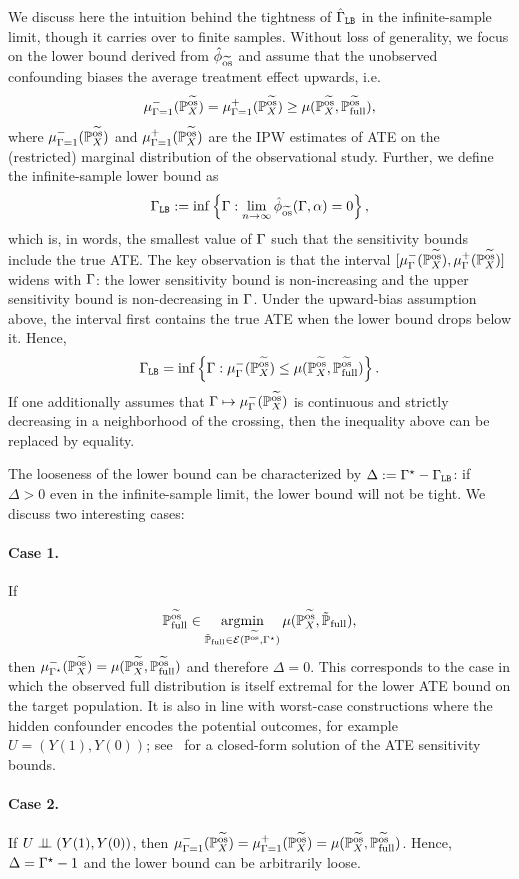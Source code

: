 We discuss here the intuition behind the tightness of $\hat{\Gamma}_{\texttt{LB}}$ in the infinite-sample limit, though it carries over to finite samples. Without loss of generality, we focus on the lower bound derived from $\hat{\phi}_{\widetilde{\mathrm{os}}}$ and assume that the unobserved confounding biases the average treatment effect upwards, i.e.
$$
\mu^-_{\Gamma=1}(\mathbb{P}^{\widetilde{\mathrm{os}}}_X) = \mu^+_{\Gamma=1}(\mathbb{P}^{\widetilde{\mathrm{os}}}_X) \geq \mu(\mathbb{P}^{\widetilde{\mathrm{os}}}_X, \mathbb{P} ^{\operatorname{\widetilde{os}}}_{\operatorname{full}}),
$$
where $\mu^-_{\Gamma=1}(\mathbb{P}^{\widetilde{\mathrm{os}}}_X)$ and $\mu^+_{\Gamma=1}(\mathbb{P}^{\widetilde{\mathrm{os}}}_X)$ are the IPW estimates of ATE on the (restricted) marginal distribution of the observational study.
Further, we define the infinite-sample lower bound as
$$
\Gamma_{\texttt{LB}} := \inf \left \{ \Gamma: \lim_{n\to \infty} \hat{\phi}_{\widetilde{\mathrm{os}}}(\Gamma,\alpha) =0 \right \},
$$
which is, in words, the smallest value of $\Gamma$ such that the sensitivity bounds include the true ATE.
The key observation is that the interval $[\mu^-_\Gamma(\mathbb{P}^{\widetilde{\mathrm{os}}}_X),\mu^+_\Gamma(\mathbb{P}^{\widetilde{\mathrm{os}}}_X)]$ widens with $\Gamma$: the lower sensitivity bound is non-increasing and the upper sensitivity bound is non-decreasing in $\Gamma$.
Under the upward-bias assumption above, the interval first contains the true ATE when the lower bound drops below it. Hence,
\begin{align*}
\Gamma_{\texttt{LB}}
= \inf \left \{ \Gamma: \mu^-_{\Gamma}(\mathbb{P}^{\widetilde{\mathrm{os}}}_X) \leq \mu(\mathbb{P}^{\widetilde{\mathrm{os}}}_X,\mathbb{P} ^{\operatorname{\widetilde{os}}}_{\operatorname{full}}) \right \}.
\end{align*}
 If one additionally assumes that $\Gamma \mapsto \mu^-_{\Gamma}(\mathbb{P}^{\widetilde{\mathrm{os}}}_X)$ is continuous and strictly decreasing in a neighborhood of the crossing, then the inequality above can be replaced by equality.

The looseness of the lower bound can be characterized by
$\Delta := \Gamma^{\star} - \Gamma_{\texttt{LB}}$: if $\Delta > 0$ even in the infinite-sample limit, the lower bound will not be tight. We discuss two interesting cases:


\paragraph{Case 1.} If
		$$
		\mathbb{P} ^{\operatorname{\widetilde{os}}}_{\operatorname{full}} \in \underset{\tilde{\mathbb{P}}_{\operatorname{full}} \in \mathcal{E}(\mathbb{P}^{\widetilde{\mathrm{os}}}, \Gamma^{\star})}{\operatorname{argmin}}\, \mu(\mathbb{P}^{\widetilde{\mathrm{os}}}_X,\tilde{\mathbb{P}}_{\operatorname{full}}),
		$$
	then $\mu_{\Gamma^{\star}}^-(\mathbb{P}^{\widetilde{\mathrm{os}}}_X) = \mu(\mathbb{P}^{\widetilde{\mathrm{os}}}_X,\mathbb{P} ^{\operatorname{\widetilde{os}}}_{\operatorname{full}})$ and therefore $\Delta=0$. This corresponds to the case in which the observed full distribution is itself extremal for the lower ATE bound on the target population. It is also in line with worst-case constructions where the hidden confounder encodes the potential outcomes, for example $U=(Y(1),Y(0))$; see~\citet{dorn2022sharp} for a closed-form solution of the ATE sensitivity bounds.


\paragraph{Case 2.} If $U \perp \!\!\! \perp (Y(1),Y(0))$, then $\mu^-_{\Gamma=1}(\mathbb{P}^{\widetilde{\mathrm{os}}}_X) = \mu^+_{\Gamma=1}(\mathbb{P}^{\widetilde{\mathrm{os}}}_X) = \mu(\mathbb{P}^{\widetilde{\mathrm{os}}}_X, \mathbb{P} ^{\operatorname{\widetilde{os}}}_{\operatorname{full}})$. Hence, $\Delta=\Gamma^{\star} -1$ and the lower bound can be arbitrarily loose.

